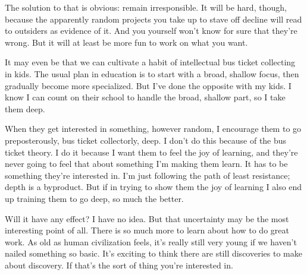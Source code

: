 \documentclass[12pt]{book}
\begin{document}
The solution to that is obvious: remain irresponsible. It will be hard,
though, because the apparently random projects you take up to stave off
decline will read to outsiders as evidence of it. And you yourself won't
know for sure that they're wrong. But it will at least be more fun to
work on what you want.

It may even be that we can cultivate a habit of intellectual bus ticket
collecting in kids. The usual plan in education is to start with a
broad, shallow focus, then gradually become more specialized. But I've
done the opposite with my kids. I know I can count on their school to
handle the broad, shallow part, so I take them deep.

When they get interested in something, however random, I encourage them
to go preposterously, bus ticket collectorly, deep. I don't do this
because of the bus ticket theory. I do it because I want them to feel
the joy of learning, and they're never going to feel that about
something I'm making them learn. It has to be something they're
interested in. I'm just following the path of least resistance; depth is
a byproduct. But if in trying to show them the joy of learning I also
end up training them to go deep, so much the better.

Will it have any effect? I have no idea. But that uncertainty may be the
most interesting point of all. There is so much more to learn about how
to do great work. As old as human civilization feels, it's really still
very young if we haven't nailed something so basic. It's exciting to
think there are still discoveries to make about discovery. If that's the
sort of thing you're interested in.
\end{document}
